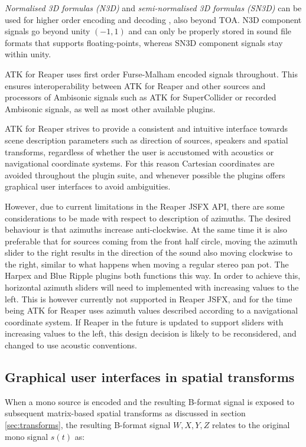 \documentclass{article}
\begin{document}
\emph{Normalised 3D formulas (N3D)} and \emph{semi-normalised 3D formulas (SN3D)} can be used for higher order encoding and decoding  \cite{daniel:2001phd}, also beyond TOA.
N3D component signals go beyond unity $(-1, 1)$ and can only be properly stored in sound file formats that supports floating-points, whereas SN3D component signals stay within unity. 

ATK for Reaper uses first order Furse-Malham encoded signals throughout.
This ensures interoperability between ATK for Reaper and other sources and processors of Ambisonic signals such as ATK for SuperCollider or recorded Ambisonic signals, as well as most other available plugins.

ATK for Reaper strives to provide a consistent and intuitive interface towards scene description parameters such as direction of sources, speakers and spatial transforms, regardless of whether the user is accustomed with acoustics or navigational coordinate systems.
For this reason Cartesian coordinates are avoided throughout the plugin suite, and whenever possible the plugins offers graphical user interfaces to avoid ambiguities.

However, due to current limitations in the Reaper JSFX API, there are some considerations to be made with respect to description of azimuths.
The desired behaviour is that azimuths increase anti-clockwise.
At the same time it is also preferable that for sources coming from the front half circle, moving the azimuth slider to the right results in the direction of the sound also moving clockwise to the right, similar to what happens when moving a regular stereo pan pot.
The Harpex and Blue Ripple plugins both functions this way.
In order to achieve this, horizontal azimuth sliders will need to implemented with increasing values to the left.
This is however currently not supported in Reaper JSFX, and for the time being ATK for Reaper uses azimuth values described according to a navigational coordinate system.
If Reaper in the future is updated to support sliders with increasing values to the left, this design decision is likely to be reconsidered, and changed to use acoustic conventions.




\subsection{Graphical user interfaces in spatial transforms}\label{sec:gui}

When a mono source is encoded and the resulting B-format signal is exposed to subsequent matrix-based spatial transforms as discussed in section \ref{sec:transforms}, the resulting B-format signal $W, X, Y, Z$ relates to the original mono signal $s(t)$ as:
\end{document}
